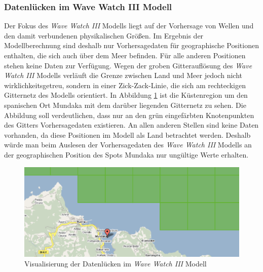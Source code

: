 \subsubsection{Datenlücken im Wave Watch III Modell}
Der Fokus des \textit{Wave Watch III} Modells liegt auf der Vorhersage
von Wellen und den damit verbundenen physikalischen Größen. Im
Ergebnis der Modellberechnung sind deshalb nur Vorhersagedaten für
geographische Positionen enthalten, die sich auch über dem Meer
befinden. Für alle anderen Positionen stehen keine Daten zur
Verfügung. Wegen der groben Gitterauflösung des \textit{Wave Watch
  III} Modells verläuft die Grenze zwischen Land und Meer jedoch nicht
wirklichkeitsgetreu, sondern in einer Zick-Zack-Linie, die sich am
rechteckigen Gitternetz des Modells orientiert. In Abbildung
\ref{positions-bestimmung} ist die Küstenregion um den spanischen Ort
Mundaka mit dem darüber liegenden Gitternetz zu sehen. Die Abbildung
soll verdeutlichen, dass nur an den grün eingefärbten Knotenpunkten
des Gitters Vorhersagedaten existieren. An allen anderen Stellen sind
keine Daten vorhanden, da diese Positionen im Modell als Land
betrachtet werden. Deshalb würde man beim Auslesen der Vorhersagedaten
des \textit{Wave Watch III} Modells an der geographischen Position des
Spots Mundaka nur ungültige Werte erhalten.

\begin{figure}
 \includegraphics[width=\textwidth]{bilder/locate-position}
 \caption{Visualisierung der Datenlücken im \textit{Wave Watch III}
   Modell}
 \label{positions-bestimmung}
\end{figure}

